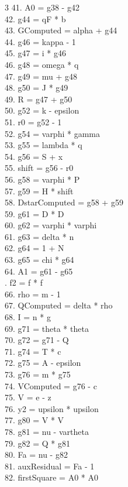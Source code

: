 \documentclass[10pt]{article}
\begin{document}
\begin{multicols}{3}
41. A0 = g38 - g42\\
42. g44 = qF * b\\
43. GComputed = alpha + g44\\
44. g46 = kappa - 1\\
45. g47 = i * g46\\
46. g48 = omega * q\\
47. g49 = mu + g48\\
48. g50 = J * g49\\
49. R = g47 + g50\\
50. g52 = k - epsilon\\
51. r0 = g52 - 1\\
52. g54 = varphi * gamma\\
53. g55 = lambda * q\\
54. g56 = S + x\\
55. shift = g56 - r0\\
56. g58 = varphi * P\\
57. g59 = H * shift\\
58. DstarComputed = g58 + g59\\
59. g61 = D * D\\
60. g62 = varphi * varphi\\
61. g63 = delta * n\\
62. g64 = 1 + N\\
63. g65 = chi * g64\\
64. A1 = g61 - g65\\
. f2 = f * f\\
66. rho = m - 1\\
67. QComputed = delta * rho\\
68. I = n * g\\
69. g71 = theta * theta\\
70. g72 = g71 - Q\\
71. g74 = T * c\\
72. g75 = A - epsilon\\
73. g76 = m * g75\\
74. VComputed = g76 - c\\
75. V = e - z\\
76. y2 = upsilon * upsilon\\
77. g80 = V * V\\
78. g81 = nu - vartheta\\
79. g82 = Q * g81\\
80. Fa = nu - g82\\
81. auxResidual = Fa - 1\\
82. firstSquare = A0 * A0\\

\end{multicols}
\end{document}
